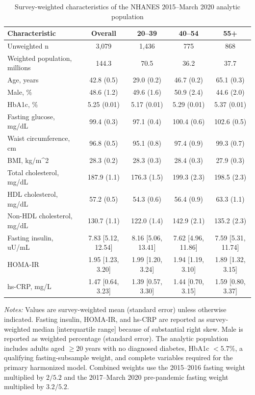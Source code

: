 \begin{table}[htbp]
\centering
\caption{Survey-weighted characteristics of the NHANES 2015--March 2020 analytic population}
\label{tab:baseline}
\small
\begin{tabular}{lcccc}
\toprule
Characteristic & Overall & 20--39 & 40--54 & 55+ \\
\midrule
Unweighted n & 3,079 & 1,436 & 775 & 868 \\
Weighted population, millions & 144.3 & 70.5 & 36.2 & 37.7 \\
Age, years & 42.8 (0.5) & 29.0 (0.2) & 46.7 (0.2) & 65.1 (0.3) \\
Male, \% & 48.6 (1.2) & 49.6 (1.6) & 50.9 (2.4) & 44.6 (2.0) \\
HbA1c, \% & 5.25 (0.01) & 5.17 (0.01) & 5.29 (0.01) & 5.37 (0.01) \\
Fasting glucose, mg/dL & 99.4 (0.3) & 97.1 (0.4) & 100.4 (0.6) & 102.6 (0.5) \\
Waist circumference, cm & 96.8 (0.5) & 95.1 (0.8) & 97.4 (0.9) & 99.3 (0.7) \\
BMI, kg/m\^{}2 & 28.3 (0.2) & 28.3 (0.3) & 28.4 (0.3) & 27.9 (0.3) \\
Total cholesterol, mg/dL & 187.9 (1.1) & 176.3 (1.5) & 199.3 (2.3) & 198.5 (2.3) \\
HDL cholesterol, mg/dL & 57.2 (0.5) & 54.3 (0.6) & 56.4 (0.9) & 63.3 (1.1) \\
Non-HDL cholesterol, mg/dL & 130.7 (1.1) & 122.0 (1.4) & 142.9 (2.1) & 135.2 (2.3) \\
Fasting insulin, uU/mL & 7.83 [5.12, 12.54] & 8.16 [5.06, 13.41] & 7.62 [4.96, 11.86] & 7.59 [5.31, 11.74] \\
HOMA-IR & 1.95 [1.23, 3.20] & 1.99 [1.20, 3.24] & 1.94 [1.19, 3.10] & 1.89 [1.32, 3.15] \\
hs-CRP, mg/L & 1.47 [0.64, 3.23] & 1.39 [0.57, 3.30] & 1.44 [0.70, 3.15] & 1.59 [0.80, 3.37] \\
\bottomrule
\end{tabular}
\begin{minipage}{0.96\textwidth}
\footnotesize
\textit{Notes:} Values are survey-weighted mean (standard error) unless otherwise indicated. Fasting insulin, HOMA-IR, and hs-CRP are reported as survey-weighted median [interquartile range] because of substantial right skew. Male is reported as weighted percentage (standard error). The analytic population includes adults aged $\geq20$ years with no diagnosed diabetes, HbA1c $<5.7\%$, a qualifying fasting-subsample weight, and complete variables required for the primary harmonized model. Combined weights use the 2015--2016 fasting weight multiplied by $2/5.2$ and the 2017--March 2020 pre-pandemic fasting weight multiplied by $3.2/5.2$.
\end{minipage}
\end{table}